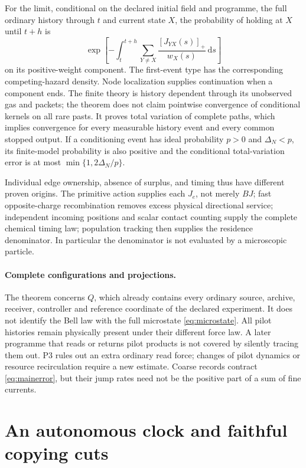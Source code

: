 \documentclass[11pt]{article}
\theoremstyle{definition}\newtheorem{definition}[theorem]{Definition}
\theoremstyle{remark}\newtheorem{remark}[theorem]{Remark}
\newcommand{\dd}{\,\mathrm d}\newcommand{\Var}{\operatorname{Var}}
\begin{document}
For the limit, conditional on the declared initial field and programme, the full ordinary history through $t$ and current state $X$, the probability of holding at $X$ until $t+h$ is
\begin{equation}
 \exp\left[-\int_t^{t+h}\sum_{Y\ne X}\frac{[J_{YX}(s)]_+}{w_X(s)}\dd s\right]
 \label{eq:survival}
\end{equation}
on its positive-weight component. The first-event type has the corresponding competing-hazard density. Node localization supplies continuation when a component ends. The finite theory is history dependent through its unobserved gas and packets; the theorem does not claim pointwise convergence of conditional kernels on all rare pasts. It proves total variation of complete paths, which implies convergence for every measurable history event and every common stopped output. If a conditioning event has ideal probability $p>0$ and $\Delta_N<p$, its finite-model probability is also positive and the conditional total-variation error is at most $\min\{1,2\Delta_N/p\}$.

Individual edge ownership, absence of surplus, and timing thus have different proven origins. The primitive action supplies each $J_e$, not merely $BJ$; fast opposite-charge recombination removes excess physical directional service; independent incoming positions and scalar contact counting supply the complete chemical timing law; population tracking then supplies the residence denominator. In particular the denominator is not evaluated by a microscopic particle.

\paragraph{Complete configurations and projections.}
The theorem concerns $Q$, which already contains every ordinary source, archive, receiver, controller and reference coordinate of the declared experiment. It does not identify the Bell law with the full microstate \eqref{eq:microstate}. All pilot histories remain physically present under their different force law. A later programme that reads or returns pilot products is not covered by silently tracing them out. P3 rules out an extra ordinary read force; changes of pilot dynamics or resource recirculation require a new estimate. Coarse records contract \eqref{eq:mainerror}, but their jump rates need not be the positive part of a sum of fine currents.

\section{An autonomous clock and faithful copying cuts}
\label{mat:section}
\end{document}
